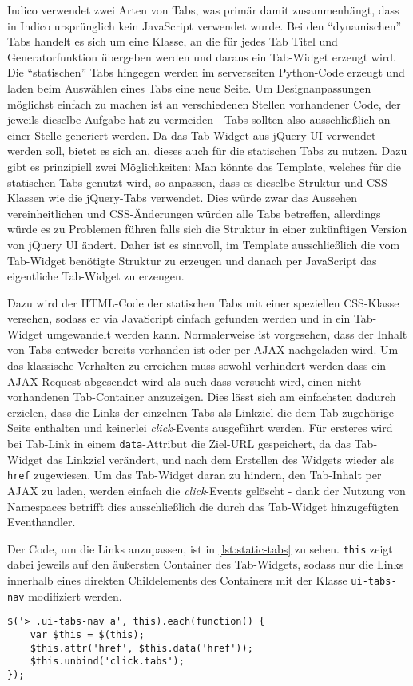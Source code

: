 Indico verwendet zwei Arten von Tabs, was primär damit zusammenhängt, dass in Indico ursprünglich
kein JavaScript verwendet wurde. Bei den \enquote{dynamischen} Tabs handelt es sich um eine Klasse,
an die für jedes Tab Titel und Generatorfunktion übergeben werden und daraus ein Tab-Widget erzeugt
wird. Die \enquote{statischen} Tabs hingegen werden im serverseiten Python-Code erzeugt und laden
beim Auswählen eines Tabs eine neue Seite. Um Designanpassungen möglichst einfach zu machen ist an
verschiedenen Stellen vorhandener Code, der jeweils dieselbe Aufgabe hat zu vermeiden - Tabs sollten
also ausschließlich an einer Stelle generiert werden. Da das Tab-Widget aus jQuery UI verwendet
werden soll, bietet es sich an, dieses auch für die statischen Tabs zu nutzen. Dazu gibt es
prinzipiell zwei Möglichkeiten: Man könnte das Template, welches für die statischen Tabs genutzt
wird, so anpassen, dass es dieselbe Struktur und CSS-Klassen wie die jQuery-Tabs verwendet. Dies
würde zwar das Aussehen vereinheitlichen und CSS-Änderungen würden alle Tabs betreffen, allerdings
würde es zu Problemen führen falls sich die Struktur in einer zukünftigen Version von jQuery UI
ändert. Daher ist es sinnvoll, im Template ausschließlich die vom Tab-Widget benötigte Struktur zu
erzeugen und danach per JavaScript das eigentliche Tab-Widget zu erzeugen.

Dazu wird der HTML-Code der statischen Tabs mit einer speziellen CSS-Klasse versehen, sodass er via
JavaScript einfach gefunden werden und in ein Tab-Widget umgewandelt werden kann. Normalerweise ist
vorgesehen, dass der Inhalt von Tabs entweder bereits vorhanden ist oder per AJAX nachgeladen wird.
Um das klassische Verhalten zu erreichen muss sowohl verhindert werden dass ein AJAX-Request
abgesendet wird als auch dass versucht wird, einen nicht vorhandenen Tab-Container anzuzeigen. Dies
lässt sich am einfachsten dadurch erzielen, dass die Links der einzelnen Tabs als Linkziel die dem
Tab zugehörige Seite enthalten und keinerlei \emph{click}-Events ausgeführt werden. Für ersteres
wird bei Tab-Link in einem \lstinline{data}-Attribut die Ziel-URL gespeichert, da das Tab-Widget das
Linkziel verändert, und nach dem Erstellen des Widgets wieder als \lstinline{href} zugewiesen. Um
das Tab-Widget daran zu hindern, den Tab-Inhalt per AJAX zu laden, werden einfach die
\emph{click}-Events gelöscht - dank der Nutzung von Namespaces betrifft dies ausschließlich die
durch das Tab-Widget hinzugefügten Eventhandler.

Der Code, um die Links anzupassen, ist in \autoref{lst:static-tabs} zu sehen. \lstinline{this} zeigt
dabei jeweils auf den äußersten Container des Tab-Widgets, sodass nur die Links innerhalb eines
direkten Childelements des Containers mit der Klasse \lstinline{ui-tabs-nav} modifiziert werden.

\begin{lstlisting}[label=lst:static-tabs,caption=Umwandlung der Tabs in reguläre Links]
$('> .ui-tabs-nav a', this).each(function() {
    var $this = $(this);
    $this.attr('href', $this.data('href'));
    $this.unbind('click.tabs');
});
\end{lstlisting}
